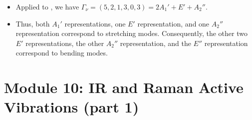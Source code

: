 \documentclass[../notes.tex]{subfiles}
\begin{document}
\begin{itemize}
    \begin{itemize}
        \item Applied to , we have $\Gamma_\nu=(5,2,1,3,0,3)=2A_1'+E'+A_2''$.
        \item Thus, both $A_1'$ representations, one $E'$ representation, and one $A_2''$ representation correspond to stretching modes. Consequently, the other two $E'$ representations, the other $A_2''$ representation, and the $E''$ representation correspond to bending modes.
    \end{itemize}
\end{itemize}



\section{Module 10: IR and Raman Active Vibrations (part 1)}
\end{document}
